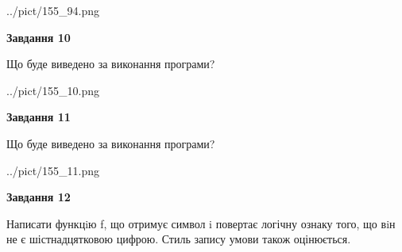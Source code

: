 \documentclass[12pt, ukrainian]{article}
\begin{document}
{\begin {large}
\begin{center}
	{../pict/155_94.png}
\end{center}
\newpage

{\begin {center}\textbf{Завдання 10}\end {center}}

Що буде виведено за виконання програми?\par
\begin{center}
	{../pict/155_10.png}
\end{center}
\newpage

{\begin {center}\textbf{Завдання 11}\end {center}}

Що буде виведено за виконання програми?\par
\begin{center}
	{../pict/155_11.png}
\end{center}
\newpage

{\begin {center}\textbf{Завдання 12}\end {center}}


Написати функцiю f, що отримує символ i повертає логічну ознаку того, що вiн не є шістнадцятковою цифрою. Стиль запису умови також оцінюється.\par
\newpage

\end {large}}
\end{document}
